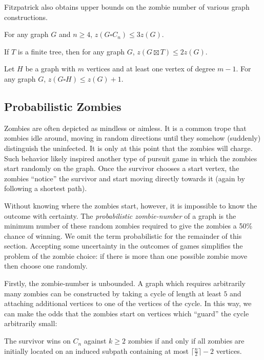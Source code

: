 Fitzpatrick also obtains upper bounds on the zombie number of various graph constructions.
\begin{theorem}
For any graph $G$ and $n \geq 4$, $z ( G \square C_n ) \leq 3 z ( G )$.
\end{theorem}

\begin{theorem}
If $T$ is a finite tree, then for any graph $G$, $z ( G \boxtimes T ) \leq 2 z ( G )$.
\end{theorem}

\begin{theorem}
Let $H$ be a graph with $m$ vertices and at least one vertex of degree $m - 1$. For any graph $G$, $z ( G \square H ) \leq z ( G ) + 1$.
\end{theorem}


\subsection{Probabilistic Zombies}\label{subsection intro probabilistic}

Zombies are often depicted as mindless or aimless. It is a common trope that zombies
idle around, moving in random directions until they somehow (suddenly) distinguish
the uninfected. It is only at this point that the zombies will charge.
Such behavior likely inspired another type of pursuit game \cite{bonato2016probabilistic} in which the zombies start randomly on the graph. Once the survivor chooses a start vertex, the zombies ``notice'' the survivor and start moving directly towards it (again by following a shortest path).

Without knowing where the zombies start, however, it is impossible to know the outcome with certainty.
The \textit{probabilistic zombie-number} of a graph is the minimum number of these random zombies required to give the zombies a 50\% chance of winning. We omit the term probabilistic for the remainder of this section. Accepting some uncertainty in the outcomes of games simplifies the problem of the zombie choice: if there is more than one possible zombie move then choose one randomly.

Firstly, the zombie-number is unbounded. A graph which requires arbitrarily many zombies can be constructed by taking a cycle of length at least $5$ and attaching additional vertices to one of the vertices of the cycle. In this way, we can make the odds that the zombies start on vertices which ``guard'' the cycle arbitrarily small:
\begin{lemma}
The survivor wins on $C_n$ against $k \geq 2$ zombies if and only if all zombies are initially located on an induced subpath containing at most $\lceil\frac{n}{2}\rceil-2$ vertices. \label{lemma subpath}
\end{lemma}

